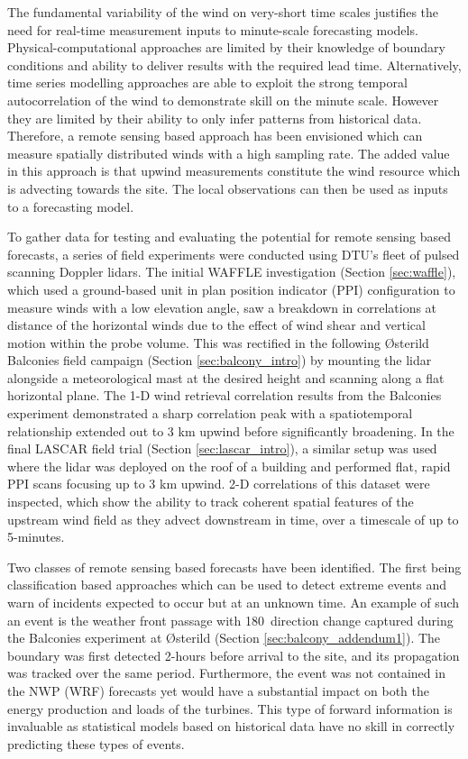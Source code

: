 The fundamental variability of the wind on very-short time scales justifies the need for real-time measurement inputs to minute-scale forecasting models. Physical-computational approaches are limited by their knowledge of boundary conditions and ability to deliver results with the required lead time. Alternatively, time series modelling approaches are able to exploit the strong temporal autocorrelation of the wind to demonstrate skill on the minute scale. However they are limited by their ability to only infer patterns from historical data. Therefore, a remote sensing based approach has been envisioned which can measure spatially distributed winds with a high sampling rate. The added value in this approach is that upwind measurements constitute the wind resource which is advecting towards the site. The local observations can then be used as inputs to a forecasting model.

To gather data for testing and evaluating the potential for remote sensing based forecasts, a series of field experiments were conducted using DTU's fleet of pulsed scanning Doppler lidars. The initial WAFFLE investigation (Section \ref{sec:waffle}), which used a ground-based unit in plan position indicator (PPI) configuration to measure winds with a low elevation angle, saw a breakdown in correlations at distance of the horizontal winds due to the effect of wind shear and vertical motion within the probe volume. This was rectified in the following {\O}sterild Balconies field campaign (Section \ref{sec:balcony_intro}) by mounting the lidar alongside a meteorological mast at the desired height and scanning along a flat horizontal plane. The 1-D wind retrieval correlation results from the Balconies experiment demonstrated a sharp correlation peak with a spatiotemporal relationship extended out to 3 km upwind before significantly broadening. In the final LASCAR field trial (Section \ref{sec:lascar_intro}), a similar setup was used where the lidar was deployed on the roof of a building and performed flat, rapid PPI scans focusing up to 3 km upwind. 2-D correlations of this dataset were inspected, which show the ability to track coherent spatial features of the upstream wind field as they advect downstream in time, over a timescale of up to 5-minutes.

Two classes of remote sensing based forecasts have been identified. The first being classification based approaches which can be used to detect extreme events and warn of incidents expected to occur but at an unknown time. An example of such an event is the weather front passage with 180\degree \ direction change captured during the Balconies experiment at {\O}sterild (Section \ref{sec:balcony_addendum1}). The boundary was first detected 2-hours before arrival to the site, and its propagation was tracked over the same period. Furthermore, the event was not contained in the NWP (WRF) forecasts yet would have a substantial impact on both the energy production and loads of the turbines. This type of forward information is invaluable as statistical models based on historical data have no skill in correctly predicting these types of events.

